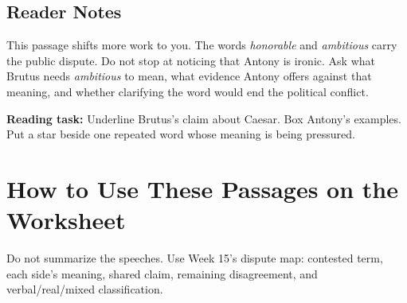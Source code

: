 \documentclass[12pt]{article}
\begin{document}
\subsection*{Reader Notes}

This passage shifts more work to you. The words \textit{honorable} and \textit{ambitious} carry the public dispute. Do not stop at noticing that Antony is ironic. Ask what Brutus needs \textit{ambitious} to mean, what evidence Antony offers against that meaning, and whether clarifying the word would end the political conflict.

\textbf{Reading task:} Underline Brutus's claim about Caesar. Box Antony's examples. Put a star beside one repeated word whose meaning is being pressured.

\section*{How to Use These Passages on the Worksheet}

Do not summarize the speeches. Use Week 15's dispute map: contested term, each side's meaning, shared claim, remaining disagreement, and verbal/real/mixed classification.
\end{document}
